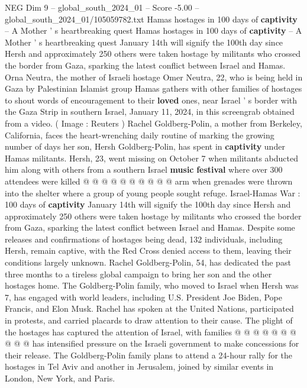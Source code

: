 \begin{textsample}{NEG Dim 9 – global\_south\_2024\_01 – Score -5.00 – global\_south\_2024\_01/105059782.txt}  \label{ex:f9_neg_424}
Hamas hostages in 100 days of \textbf{captivity} -- A Mother ' s heartbreaking quest Hamas hostages in 100 days of \textbf{captivity} -- A Mother ' s heartbreaking quest January 14th will signify the 100th day since Hersh and approximately 250 others were taken hostage by militants who crossed the border from Gaza, sparking the latest conflict between Israel and Hamas.
Orna Neutra, the mother of Israeli hostage Omer Neutra, 22, who is being held in Gaza by Palestinian Islamist group Hamas gathers with other families of hostages to shout words of encouragement to their \textbf{loved} ones, near Israel ' s border with the Gaza Strip in southern Israel, January 11, 2024, in this screengrab obtained from a video. ( Image : Reuters ) Rachel Goldberg-Polin, a mother from Berkeley, California, faces the heart-wrenching daily routine of marking the growing number of days her son, Hersh Goldberg-Polin, has spent in \textbf{captivity} under Hamas militants.
Hersh, 23, went missing on October 7 when militants abducted him along with others from a southern Israel \textbf{music} \textbf{festival} where over 300 attendees were killed @ @ @ @ @ @ @ @ @ @ arm when grenades were thrown into the shelter where a group of young people sought refuge.
Israel-Hamas War : 100 days of \textbf{captivity} January 14th will signify the 100th day since Hersh and approximately 250 others were taken hostage by militants who crossed the border from Gaza, sparking the latest conflict between Israel and Hamas.
Despite some releases and confirmations of hostages being dead, 132 individuals, including Hersh, remain captive, with the Red Cross denied access to them, leaving their conditions largely unknown.
Rachel Goldberg-Polin, 54, has dedicated the past three months to a tireless global campaign to bring her son and the other hostages home.
The Goldberg-Polin family, who moved to Israel when Hersh was 7, has engaged with world leaders, including U.S.
President Joe Biden, Pope Francis, and Elon Musk.
Rachel has spoken at the United Nations, participated in protests, and carried placards to draw attention to their cause.
The plight of the hostages has captured the attention of Israel, with families @ @ @ @ @ @ @ @ @ @ has intensified pressure on the Israeli government to make concessions for their release.
The Goldberg-Polin family plans to attend a 24-hour rally for the hostages in Tel Aviv and another in Jerusalem, joined by similar events in London, New York, and Paris.

\end{textsample}
